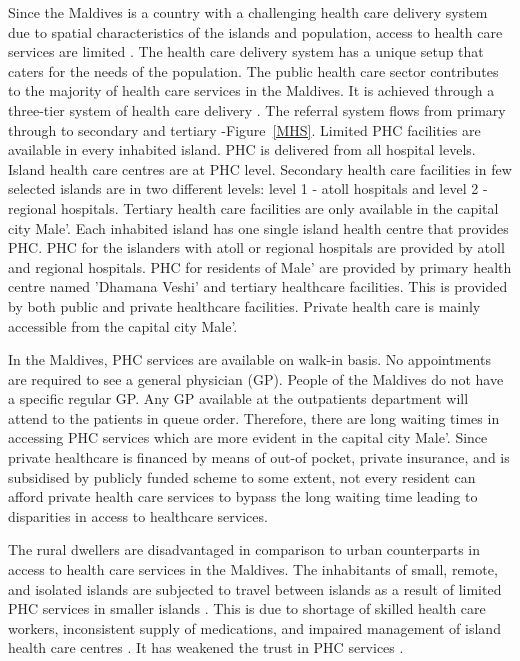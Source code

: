 Since the Maldives is a country with a challenging health care delivery system due to spatial characteristics of the islands and population, access to health care services are limited \cite{MOH:health:plan}. The health care delivery system has a unique setup that caters for the needs of the population. The public health care sector contributes to the majority of health care services in the Maldives. It is achieved through a three-tier system of health care delivery \cite{MOH:health:plan}. The referral system flows from primary through to secondary and tertiary -Figure~\ref{MHS}. Limited PHC facilities are available in every inhabited island. PHC is delivered from all hospital levels. Island health care centres are at PHC level. Secondary health care facilities in few selected islands are in two different levels: level 1 - atoll hospitals and level 2 - regional hospitals. Tertiary health care facilities are only available in the capital city Male'. Each inhabited island has one single island health centre that provides PHC. PHC for the islanders with atoll or regional hospitals are provided by atoll and regional hospitals. PHC for residents of Male' are provided by primary health centre named 'Dhamana Veshi' and tertiary healthcare facilities. This is provided by both public and private healthcare facilities. Private health care is mainly accessible from the capital city Male'.

In the Maldives, PHC services are available on walk-in basis. No appointments are required to see a general physician (GP). People of the Maldives do not have a specific regular GP. Any GP available at the outpatients department will attend to the patients in queue order. Therefore, there are long waiting times in accessing PHC services which are more evident in the capital city Male'. Since private healthcare is financed by means of out-of pocket, private insurance, and is subsidised by publicly funded scheme to some extent, not every resident can afford private health care services to bypass the long waiting time leading to disparities in access to healthcare services. 
 
The rural dwellers are disadvantaged in comparison to urban counterparts in access to health care services in the Maldives. The inhabitants of small, remote, and isolated islands are subjected to travel between islands as a result of limited PHC services in smaller islands \cite{MOH:health:plan}. This is due to shortage of skilled health care workers, inconsistent supply of medications, and impaired management of island health care centres \cite{MOH:health:plan}. It has weakened the trust in PHC services \cite{health:profile:2010}. 

